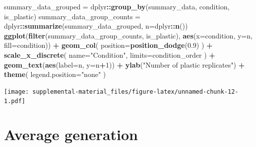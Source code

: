 \documentclass[]{book}
\newenvironment{Shaded}{\begin{snugshade}}{\end{snugshade}}
\newcommand{\DataTypeTok}[1]{\textcolor[rgb]{0.13,0.29,0.53}{#1}}
\newcommand{\DecValTok}[1]{\textcolor[rgb]{0.00,0.00,0.81}{#1}}
\newcommand{\FloatTok}[1]{\textcolor[rgb]{0.00,0.00,0.81}{#1}}
\newcommand{\KeywordTok}[1]{\textcolor[rgb]{0.13,0.29,0.53}{\textbf{#1}}}
\newcommand{\NormalTok}[1]{#1}
\newcommand{\OperatorTok}[1]{\textcolor[rgb]{0.81,0.36,0.00}{\textbf{#1}}}
\newcommand{\StringTok}[1]{\textcolor[rgb]{0.31,0.60,0.02}{#1}}
\begin{document}
\begin{Shaded}
\begin{Highlighting}[]
\NormalTok{summary_data_grouped =}\StringTok{ }\NormalTok{dplyr}\OperatorTok{::}\KeywordTok{group_by}\NormalTok{(summary_data, condition, is_plastic)}
\NormalTok{summary_data_group_counts =}\StringTok{ }\NormalTok{dplyr}\OperatorTok{::}\KeywordTok{summarize}\NormalTok{(summary_data_grouped, }\DataTypeTok{n=}\NormalTok{dplyr}\OperatorTok{::}\KeywordTok{n}\NormalTok{())}
\KeywordTok{ggplot}\NormalTok{(}\KeywordTok{filter}\NormalTok{(summary_data_group_counts, is_plastic), }\KeywordTok{aes}\NormalTok{(}\DataTypeTok{x=}\NormalTok{condition, }\DataTypeTok{y=}\NormalTok{n, }\DataTypeTok{fill=}\NormalTok{condition)) }\OperatorTok{+}
\StringTok{  }\KeywordTok{geom_col}\NormalTok{(}
    \DataTypeTok{position=}\KeywordTok{position_dodge}\NormalTok{(}\FloatTok{0.9}\NormalTok{)}
\NormalTok{  ) }\OperatorTok{+}
\StringTok{  }\KeywordTok{scale_x_discrete}\NormalTok{(}
    \DataTypeTok{name=}\StringTok{"Condition"}\NormalTok{,}
    \DataTypeTok{limits=}\NormalTok{condition_order}
\NormalTok{  ) }\OperatorTok{+}
\StringTok{  }\KeywordTok{geom_text}\NormalTok{(}\KeywordTok{aes}\NormalTok{(}\DataTypeTok{label=}\NormalTok{n, }\DataTypeTok{y=}\NormalTok{n}\OperatorTok{+}\DecValTok{1}\NormalTok{)) }\OperatorTok{+}
\StringTok{  }\KeywordTok{ylab}\NormalTok{(}\StringTok{"Number of plastic replicates"}\NormalTok{) }\OperatorTok{+}
\StringTok{  }\KeywordTok{theme}\NormalTok{(}
    \DataTypeTok{legend.position=}\StringTok{"none"}
\NormalTok{  )}
\end{Highlighting}
\end{Shaded}

\texttt{[image: supplemental-material\_files/figure-latex/unnamed-chunk-12-1.pdf]}

\hypertarget{average-generation}{%
\section{Average generation}\label{average-generation}}
\end{document}
